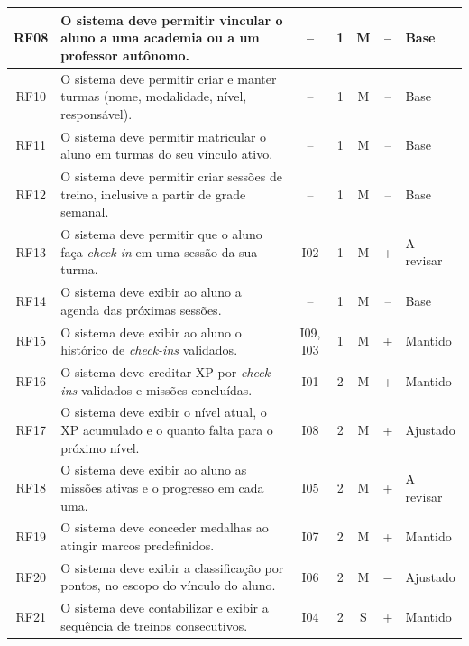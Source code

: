 \begin{quadrolongo}
\begin{longtable}{|c|p{6.6cm}|c|c|c|c|p{1.6cm}|}
    RF08 & O sistema deve permitir vincular o aluno a uma academia ou a um professor autônomo. & -- & 1 & M & -- & Base \\ \hline
    RF10 & O sistema deve permitir criar e manter turmas (nome, modalidade, nível, responsável). & -- & 1 & M & -- & Base \\ \hline
    RF11 & O sistema deve permitir matricular o aluno em turmas do seu vínculo ativo. & -- & 1 & M & -- & Base \\ \hline
    RF12 & O sistema deve permitir criar sessões de treino, inclusive a partir de grade semanal. & -- & 1 & M & -- & Base \\ \hline
    RF13 & O sistema deve permitir que o aluno faça \textit{check-in} em uma sessão da sua turma. & I02 & 1 & M & + & A revisar \\ \hline
    RF14 & O sistema deve exibir ao aluno a agenda das próximas sessões. & -- & 1 & M & -- & Base \\ \hline
    RF15 & O sistema deve exibir ao aluno o histórico de \textit{check-ins} validados. & I09, I03 & 1 & M & + & Mantido \\ \hline
    RF16 & O sistema deve creditar XP por \textit{check-ins} validados e missões concluídas. & I01 & 2 & M & + & Mantido \\ \hline
    RF17 & O sistema deve exibir o nível atual, o XP acumulado e o quanto falta para o próximo nível. & I08 & 2 & M & + & Ajustado \\ \hline
    RF18 & O sistema deve exibir ao aluno as missões ativas e o progresso em cada uma. & I05 & 2 & M & + & A revisar \\ \hline
    RF19 & O sistema deve conceder medalhas ao atingir marcos predefinidos. & I07 & 2 & M & + & Mantido \\ \hline
    RF20 & O sistema deve exibir a classificação por pontos, no escopo do vínculo do aluno. & I06 & 2 & M & $-$ & Ajustado \\ \hline
    RF21 & O sistema deve contabilizar e exibir a sequência de treinos consecutivos. & I04 & 2 & S & + & Mantido \\ \hline
\end{longtable}
\end{quadrolongo}

